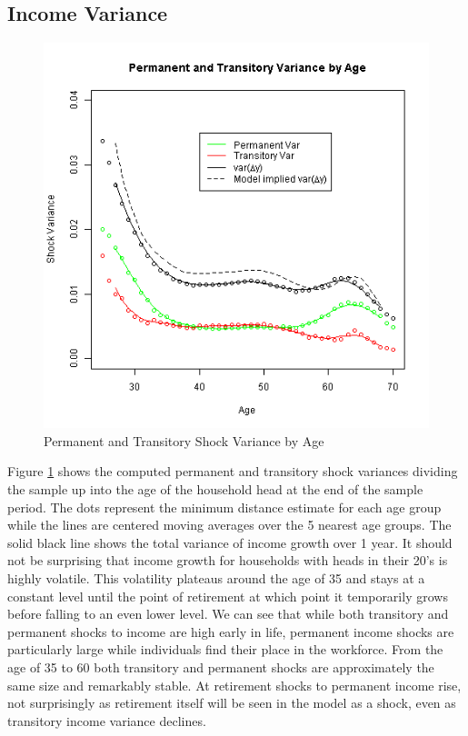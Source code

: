 \documentclass[titlepage]{\econtex}\newcommand{\texname}{IncomeUncertainty}
\begin{document}
\subsection{Income Variance} \label{inc_variance}
\begin{figure} 
\begin{centering}
	\includegraphics[scale=0.6]{Figures/VarianceByAge.png} 
	\caption{Permanent and Transitory Shock Variance by Age}
	\label{fig:VarianceByAge}
\end{centering}
\end{figure}
Figure \ref{fig:VarianceByAge} shows the computed permanent and transitory shock variances dividing the sample up into the age of the household head at the end of the sample period. The dots represent the minimum distance estimate for each age group while the lines are centered moving averages over the 5 nearest age groups. The solid black line shows the total variance of income growth over 1 year. It should not be surprising that income growth for households with heads in their 20's is highly volatile. This volatility plateaus around the age of 35 and stays at a constant level until the point of retirement at which point it temporarily grows before falling to an even lower level. We can see that while both transitory and permanent shocks to income are high early in life, permanent income shocks are particularly large while individuals find their place in the workforce. From the age of 35 to 60 both transitory and permanent shocks are approximately the same size and remarkably stable. At retirement shocks to permanent income rise, not surprisingly as retirement itself will be seen in the model as a shock, even as transitory income variance declines.
\end{document}
